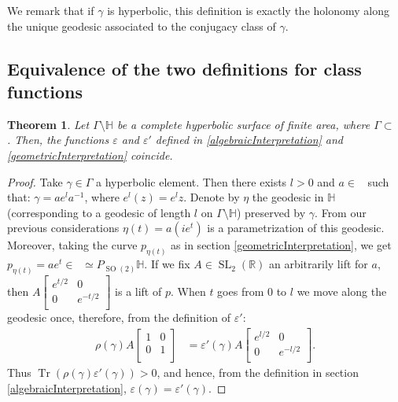 \documentclass[12pt]{amsart}
\newtheorem{theorem}[proposition]{Theorem}
\theoremstyle{definition}
\def\RR{{\mathbb R}}
\def\HH{{\mathbb{H}}}
\def\g{{\gamma}}
\def\G{{\Gamma}}
\DeclareMathOperator{\tr}{Tr}
\DeclareMathOperator{\psl}{PSL_2(\mathbb{R})}
\newcommand{\slinear}{\operatorname{SL}}
\newcommand{\so}{\operatorname{SO}}
\begin{document}
We remark that if $\g$ is hyperbolic, this definition is exactly the holonomy along the unique geodesic associated to the conjugacy class of $\g$.
\subsection{Equivalence of the two definitions for class functions}

\begin{theorem}\label{teoremEgalitateDefinitii}
Let $\G\setminus \HH$ be a complete hyperbolic surface of finite area, where $\G\subset \psl$. Then, the functions $\varepsilon$ and $\varepsilon'$ defined in \ref{algebraicInterpretation} and \ref{geometricInterpretation} coincide.
\end{theorem}
\begin{proof}
Take $\g\in\G$ a hyperbolic element. Then there exists $l>0$ and $a\in \psl$ such that: 
$\g=a e^l a^{-1}$, where $e^l (z) = e^lz$. Denote by $\eta$ the geodesic in $\HH$ (corresponding to a geodesic of length $l$ on $\G\setminus \HH$) preserved by $\g$. From our previous considerations $\eta(t)=a(ie^t)$ is a parametrization of this geodesic. Moreover, taking the curve $p_{\eta(t)}$ as in section \ref{geometricInterpretation}, we get $p_{\eta(t)}=ae^t\in \psl \simeq P_{\so(2)}\HH$. If we fix $A \in \slinear_2(\RR)$ an arbitrarily lift for $a$, then 
$A\begin{bmatrix}
e^{t/2} & 0 \\
0 & e^{-t/2} \\
\end{bmatrix}$ is a lift of $p$. When $t$ goes from $0$ to $l$ we move along the geodesic once, therefore, from the definition of $\varepsilon'$:
\begin{align*}
\rho(\g) A 
\begin{bmatrix}
1 & 0 \\
0 & 1 \\
\end{bmatrix}  &= \varepsilon'(\g) 
A
\begin{bmatrix}
e^{l/2} & 0 \\
0 & e^{-l/2} \\
\end{bmatrix}.
\end{align*}
Thus $\tr (\rho(\g)\varepsilon'(\g))>0$, and hence, from the definition in section \ref{algebraicInterpretation}, $\varepsilon(\g)=\varepsilon'(\g)$.


\end{proof}
\end{document}
